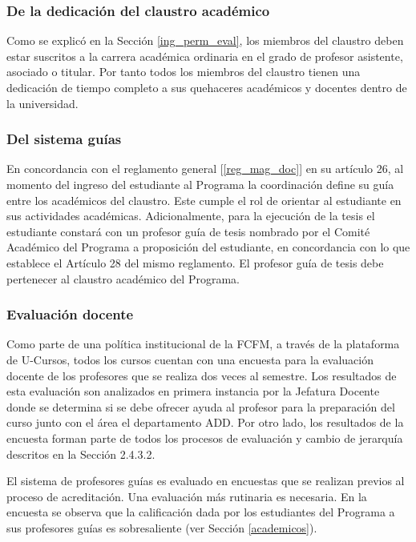 \subsubsection{De la dedicación del claustro académico}

Como se explicó en la Sección \ref{ing_perm_eval}, los miembros
del claustro deben estar suscritos a la carrera académica ordinaria en el grado de profesor asistente,
asociado o titular. Por tanto todos los miembros del claustro tienen una dedicación de tiempo
completo a sus quehaceres académicos y docentes dentro de la universidad.

\subsubsection{Del sistema guías}

En concordancia con el reglamento general [\ref{reg_mag_doc}] en su artículo 26, al momento del ingreso del
estudiante al Programa la coordinación define su guía entre los académicos del claustro. Este
cumple el rol de orientar al estudiante en sus actividades académicas. Adicionalmente, para la
ejecución de la tesis el estudiante constará con un profesor guía de tesis nombrado por el Comité
Académico del Programa a proposición del estudiante, en concordancia con lo que establece el
Artículo 28 del mismo reglamento. El profesor guía de tesis debe pertenecer al claustro académico
del Programa.

\subsubsection{Evaluación docente}

Como parte de una política institucional de la FCFM, a través de la plataforma de U-Cursos, todos
los cursos cuentan con una encuesta para la evaluación docente de los profesores que se realiza
dos veces al semestre. Los resultados de esta evaluación son analizados en primera instancia por la
Jefatura Docente donde se determina si se debe ofrecer ayuda al profesor para la preparación del
curso junto con el área el departamento ADD. Por otro lado, los resultados de la encuesta forman
parte de todos los procesos de evaluación y cambio de jerarquía descritos en la Sección 2.4.3.2.

El sistema de profesores guías es evaluado en encuestas que se realizan previos al
proceso de acreditación. Una evaluación más rutinaria es necesaria. En la encuesta se observa que
la calificación dada por los estudiantes del Programa a sus profesores guías es
sobresaliente (ver Sección \ref{academicos}).

